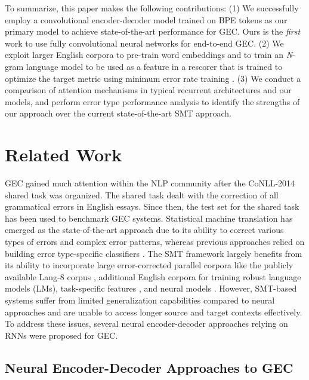 \documentclass[letterpaper]{article} %
\begin{document}
To summarize, this paper makes the following contributions: (1) We successfully employ a convolutional encoder-decoder model trained on BPE tokens as our primary model to achieve state-of-the-art performance for GEC. Ours is the \emph{first} work to use fully convolutional neural networks for end-to-end GEC. (2) We exploit larger English corpora to pre-train word embeddings and to train an \textit{N}-gram language model to be used as a feature in a rescorer that is trained to optimize the target metric using minimum error rate training \cite{och2003mert}. (3) We conduct a comparison of attention mechanisms in typical recurrent architectures and our models, and perform error type performance analysis to identify the strengths of our approach over the current state-of-the-art SMT approach.



\section{Related Work}

GEC gained much attention within the NLP community after the CoNLL-2014 shared task \cite{ng2014conll2014} was organized. The shared task dealt with the correction of all grammatical errors in English essays. Since then, the test set for the shared task has been used to benchmark GEC systems. Statistical machine translation has emerged as the state-of-the-art approach \cite{chollampatt2017connectingdots} due to its ability to correct various types of errors and complex error patterns, whereas previous approaches relied on building error type-specific classifiers \cite{dahlmeier-ng-ng:2012:BEA,rozovskaya2014illinois}. The SMT framework largely benefits from its ability to incorporate large error-corrected parallel corpora like the publicly available Lang-8 corpus \cite{mizumoto2011mining}, additional English corpora for training robust language models (LMs), task-specific features \cite{junczysdowmunt2016phrase}, and neural models \cite{chollampatt2016neural}. However, SMT-based systems suffer from limited generalization capabilities compared to neural approaches and are unable to access longer source and target contexts effectively. To address these issues, several neural encoder-decoder approaches relying on RNNs were proposed for GEC.

\subsection{Neural Encoder-Decoder Approaches to GEC}
\end{document}
